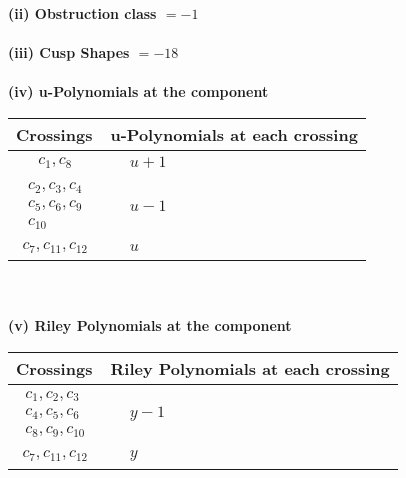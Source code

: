 \documentclass[1p]{elsarticle_modified}
\theoremstyle{definition}
\begin{document}
\flushleft \textbf{(ii) Obstruction class $= -1$}\\~\\
\flushleft \textbf{(iii) Cusp Shapes $= -18$}\\~\\
\newpage\renewcommand{\arraystretch}{1}
\flushleft \textbf{(iv) u-Polynomials at the component}\newline \\
\begin{tabular}{m{50pt}|m{274pt}}
Crossings & \hspace{64pt}u-Polynomials at each crossing \\
\hline $$\begin{aligned}c_{1},c_{8}\end{aligned}$$&$\begin{aligned}
&u+1
\end{aligned}$\\
\hline $$\begin{aligned}c_{2},c_{3},c_{4}\\c_{5},c_{6},c_{9}\\c_{10}\end{aligned}$$&$\begin{aligned}
&u-1
\end{aligned}$\\
\hline $$\begin{aligned}c_{7},c_{11},c_{12}\end{aligned}$$&$\begin{aligned}
&u
\end{aligned}$\\
\hline
\end{tabular}\\~\\
\newpage\renewcommand{\arraystretch}{1}
\flushleft \textbf{(v) Riley Polynomials at the component}\newline \\
\begin{tabular}{m{50pt}|m{274pt}}
Crossings & \hspace{64pt}Riley Polynomials at each crossing \\
\hline $$\begin{aligned}c_{1},c_{2},c_{3}\\c_{4},c_{5},c_{6}\\c_{8},c_{9},c_{10}\end{aligned}$$&$\begin{aligned}
&y-1
\end{aligned}$\\
\hline $$\begin{aligned}c_{7},c_{11},c_{12}\end{aligned}$$&$\begin{aligned}
&y
\end{aligned}$\\
\hline
\end{tabular}\\~\\
\end{document}
